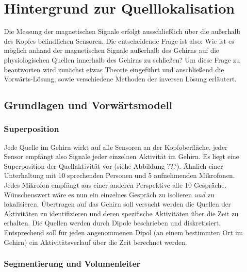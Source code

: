 \documentclass[doc,a4paper,12pt]{apa6}
\begin{document}

\newpage
\section{Hintergrund zur Quelllokalisation}

Die Messung der magnetischen Signale erfolgt ausschließlich über die außerhalb des Kopfes befindlichen Sensoren. Die entscheidende Frage ist also: Wie ist es möglich anhand der magnetischen Signale außerhalb des Gehirns auf die physiologischen Quellen innerhalb des Gehirns zu schließen? Um diese Frage zu beantworten wird zunächst etwas Theorie eingeführt und anschließend die Vorwärts-Lösung, sowie verschiedene Methoden der inversen Lösung erläutert.


\subsection{Grundlagen und Vorwärtsmodell}

\subsubsection{Superposition}

Jede Quelle im Gehirn wirkt auf alle Sensoren an der Kopfoberfläche, jeder Sensor empfängt also Signale jeder einzelnen Aktivität im Gehirn. Es liegt eine Superposition der Quellaktivität vor (siehe Abbildung ???). Ähnlich einer Unterhaltung mit 10 sprechenden Personen und 5 aufnehmenden Mikrofonen. Jedes Mikrofon empfängt aus einer anderen Perspektive alle 10 Gespräche. Wünschenswert wäre es nun ein einzelnes Gespräch zu isolieren \emph{und} zu lokalisieren. Übertragen auf das Gehirn soll versucht werden die Quellen der Aktivitäten zu identifizieren und deren spezifische Aktivitäten über die Zeit zu erhalten. Die Quellen werden durch Dipole beschrieben und diskretisiert. Entsprechend soll für jeden angenommenen Dipol (an einem bestimmten Ort im Gehirn) ein Aktivitätsverlauf über die Zeit berechnet werden.

\subsubsection{Segmentierung und Volumenleiter}
\end{document}

